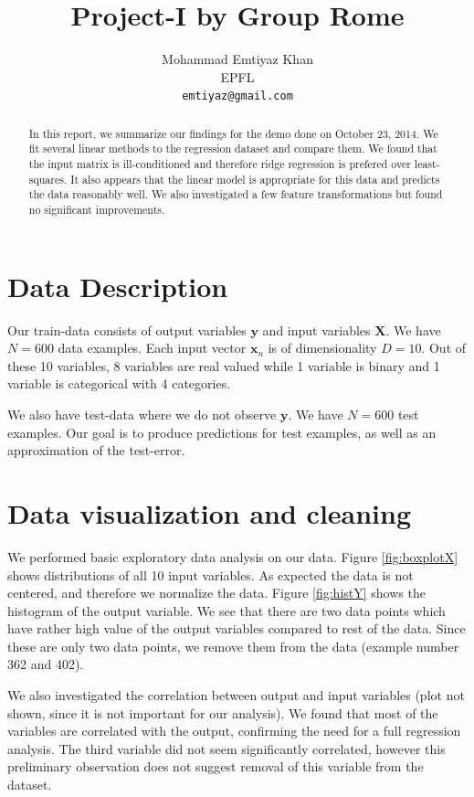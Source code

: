 \documentclass{article} %
\title{Project-I by Group Rome}
\author{
Mohammad Emtiyaz Khan\\
EPFL \\
\texttt{emtiyaz@gmail.com} \\
}
\begin{document}
\maketitle

\begin{abstract}
In this report, we summarize our findings for the demo done on October 23, 2014.
We fit several linear methods to the regression dataset and compare them.
We found that the input matrix is ill-conditioned and therefore ridge regression is prefered over least-squares. It also appears that the linear model is appropriate for this data and predicts the data reasonably well. We also investigated a few feature transformations but found no significant improvements.
\end{abstract}

\section{Data Description}
Our train-data consists of output variables $\mathbf{y}$ and input variables $\mathbf{X}$. We have $N=600$ data examples. Each input vector $\mathbf{x}_n$ is of dimensionality $D=10$. Out of these 10 variables, 8 variables are real valued while 1 variable is binary and 1 variable is categorical with 4 categories.

We also have test-data where we do not observe $\mathbf{y}$. We have $N=600$ test examples. Our goal is to produce predictions for test examples, as well as an approximation of the test-error.

\section{Data visualization and cleaning}
We performed basic exploratory data analysis on our data. Figure \ref{fig:boxplotX} shows distributions of all 10 input variables. As expected the data is not centered, and therefore we normalize the data. Figure \ref{fig:histY} shows the histogram of the output variable. We see that there are two data points which have rather high value of the output variables compared to rest of the data. Since these are only two data points, we remove them from the data (example number 362 and 402).

We also investigated the correlation between output and input variables (plot not shown, since it is not important for our analysis). We found that most of the variables are correlated with the output, confirming the need for a full regression analysis. The third variable did not seem significantly correlated, however this preliminary observation does not suggest removal of this variable from the dataset.
\end{document}
